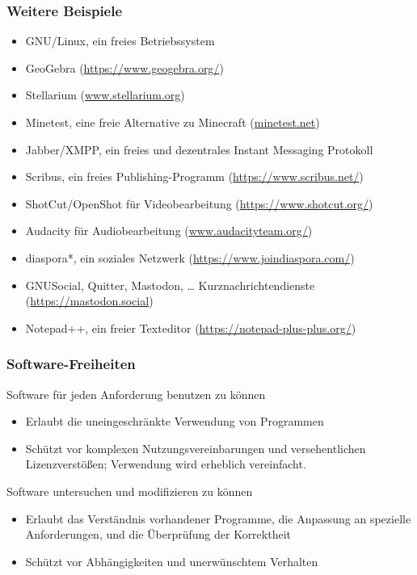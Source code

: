 \documentclass{beamer}
\begin{document}
\begin{frame}
  \frametitle{Weitere Beispiele}

  \onslide<+->

  \begin{itemize}
  \item GNU/Linux, ein freies Betriebssystem %
  \item GeoGebra (\url{https://www.geogebra.org/})
  \item Stellarium (\url{www.stellarium.org})
  \item Minetest, eine freie Alternative zu Minecraft (\url{minetest.net})
  \item Jabber/XMPP, ein freies und dezentrales Instant Messaging Protokoll
  \item Scribus, ein freies Publishing-Programm (\url{https://www.scribus.net/})
  \item ShotCut/OpenShot für Videobearbeitung (\url{https://www.shotcut.org/})
  \item Audacity für Audiobearbeitung (\url{www.audacityteam.org/})
  \item diaspora*, ein soziales Netzwerk (\url{https://www.joindiaspora.com/})
  \item GNUSocial, Quitter, Mastodon, \dots{} Kurznachrichtendienste (\url{https://mastodon.social})
  \item Notepad++, ein freier Texteditor (\url{https://notepad-plus-plus.org/})
  \end{itemize}

\end{frame}

\begin{frame}
  \frametitle{Software-Freiheiten}

  \onslide<+->
  \onslide<+->

  \begin{block}{Software für jeden Anforderung benutzen zu können}
    \begin{itemize}
    \item Erlaubt die uneingeschränkte Verwendung von Programmen
    \item Schützt vor komplexen Nutzungsvereinbarungen und versehentlichen
      Lizenzverstößen; Verwendung wird erheblich vereinfacht.
    \end{itemize}
  \end{block}

  \onslide<+->

  \begin{block}{Software untersuchen und modifizieren zu können}
    \begin{itemize}
    \item Erlaubt das Verständnis vorhandener Programme, die Anpassung an
      spezielle Anforderungen, und die Überprüfung der Korrektheit
    \item Schützt vor Abhängigkeiten und unerwünschtem Verhalten
    \end{itemize}
  \end{block}

\end{frame}
\end{document}
